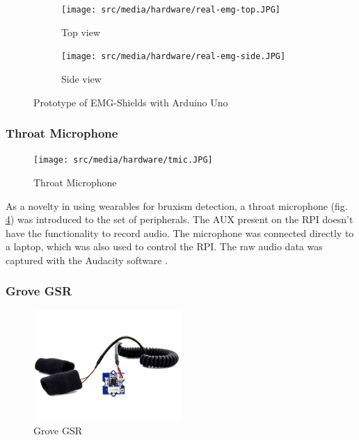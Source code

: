 \begin{figure}[h!]
\centering
 \begin{subfigure}[b]{0.49\textwidth}
    \texttt{[image: src/media/hardware/real-emg-top.JPG]}
    \caption{Top view}
    \label{image:real-emg-top}
  \end{subfigure}
 \hfill
 \begin{subfigure}[b]{0.49\textwidth}
    \texttt{[image: src/media/hardware/real-emg-side.JPG]}
    \caption{Side view}
    \label{image:real-emg-side}
  \end{subfigure}
\caption{Prototype of EMG-Shields with Arduino Uno}
\label{image:real-emg}
\end{figure}

\subsubsection{Throat Microphone}
\label{subsub:tmic}

\begin{figure}[h!]
\centering
\texttt{[image: src/media/hardware/tmic.JPG]}
\caption{Throat Microphone}
\label{image:tmic}
\end{figure}

As a novelty in using wearables for bruxism detection, a throat microphone (fig. \ref{image:tmic}) was introduced to the set of peripherals. The AUX present on the RPI doesn't have the functionality to record audio. The microphone was connected directly to a laptop, which was also used to control the RPI. The raw audio data was captured with the Audacity software \cite{crook_2022}.


\subsubsection{Grove GSR}
\label{subsub:gsr}

\begin{figure}[h!]
\centering
\includegraphics[width=0.5\textwidth]{src/media/hardware/gsr.jpg}
\caption{Grove GSR}
\label{image:gsr}
\end{figure}

